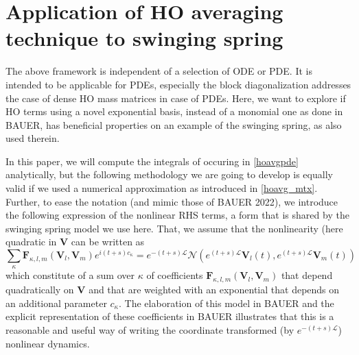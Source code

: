 \documentclass[a4,12pt]{article}
\newcommand{\V}{\mathbf{V}}
\newcommand{\Fu}{\mathbf{F}}
\newcommand{\opL}{\mathcal{L}}
\newcommand{\opN}{\mathcal{N}}
\begin{document}
\section{Application of HO averaging technique to swinging spring}

The above framework is independent of a selection of ODE or PDE. It is intended to be applicable for PDEs, especially the block diagonalization addresses the case of dense HO mass matrices in case of PDEs. Here, we want to explore if HO terms using a novel exponential basis, instead of a monomial one as done in BAUER, has beneficial properties on an example of the swinging spring, as also used therein.

In this paper, we will compute the integrals of occuring in \eqref{hoavgpde} analytically, but the following methodology we are going to develop is equally valid if we used a numerical approximation as introduced in \eqref{hoavg_mtx}. Further, to ease the notation (and mimic those of BAUER 2022), we introduce the following expression of the nonlinear RHS terms, a form that is shared by the swinging spring model we use here. That, we assume that the nonlinearity (here quadratic in $\V$ can be written as
\begin{equation}
 \sum_{\kappa} \Fu_{\kappa,l,m}(\V_l,\V_m) e^{i {(t + s) c_\kappa} }
  =   e^{-(t+s) \opL} \opN \left(e^{ (t+s) \opL}  {\V_{l}}(t), e^{ (t+s) \opL} {\V_{m}}(t)\right)
\end{equation}
which constitute of a sum over $\kappa$ of coefficients $ \Fu_{\kappa,l,m}(\V_l,\V_m)$ that depend quadratically on $\V$ and that are weighted with an exponential that depends on an additional parameter $c_\kappa$. The elaboration of this model in BAUER and the explicit representation of these coefficients in BAUER illustrates that this is a reasonable and useful way of writing the coordinate transformed (by $e^{-(t+s) \opL}$) nonlinear dynamics.
\end{document}
